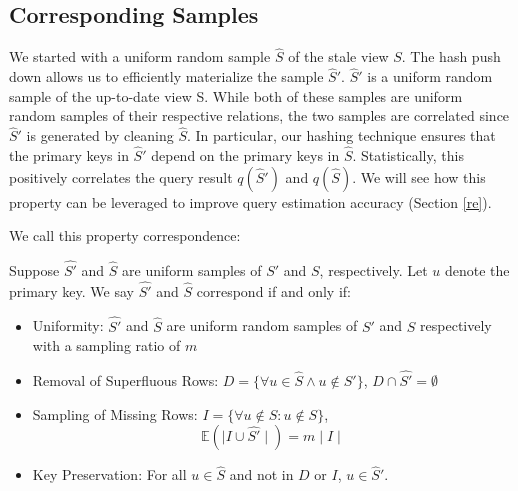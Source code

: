 \subsection{Corresponding Samples}
We started with a uniform random sample $\widehat{S}$ of the stale view $S$.
The hash push down allows us to efficiently materialize the sample $\widehat{S}'$.
$\widehat{S}'$ is a uniform random sample of the up-to-date view S.
While both of these samples are uniform random samples of their respective relations, 
the two samples are correlated since $\widehat{S}'$ is generated by cleaning $\widehat{S}$.
In particular, our hashing technique ensures that the primary keys in $\widehat{S}'$ depend on the primary keys in $\widehat{S}$.
Statistically, this positively correlates the query result $q(\widehat{S}')$ and $q(\widehat{S})$. 
We will see how this property can be leveraged to improve query estimation accuracy (Section \ref{re}). 

We call this property correspondence:
\begin{property}[Correspondence]
Suppose $\widehat{S'}$ and $\widehat{S}$ are uniform samples of $S'$ and $S$, respectively.  Let $u$ denote the primary key. We say $\widehat{S'}$ and $\widehat{S}$ correspond if and only if:
\vspace{-.25em}
\begin{itemize}[noitemsep]
\item Uniformity: $\widehat{S'}$ and $\widehat{S}$ are uniform random samples of $S'$ and $S$ respectively with a sampling ratio of $m$
\item Removal of Superfluous Rows: $D = \{\forall u \in \widehat{S} \wedge u \not\in S'\}$, $D \cap \widehat{S'} = \emptyset$ 
\item Sampling of Missing Rows: $I = \{\forall u \not\in S : u \not \in S\}$, \[\mathbb{E}(\mid I \cup \widehat{S'} \mid) = m\mid I \mid \]
\item Key Preservation: For all $u\in \widehat{S}$ and not in $D$ or $I$, $u\in \widehat{S}'$.
\end{itemize}
\vspace{-.25em}
\label{correspondence}
\end{property}

